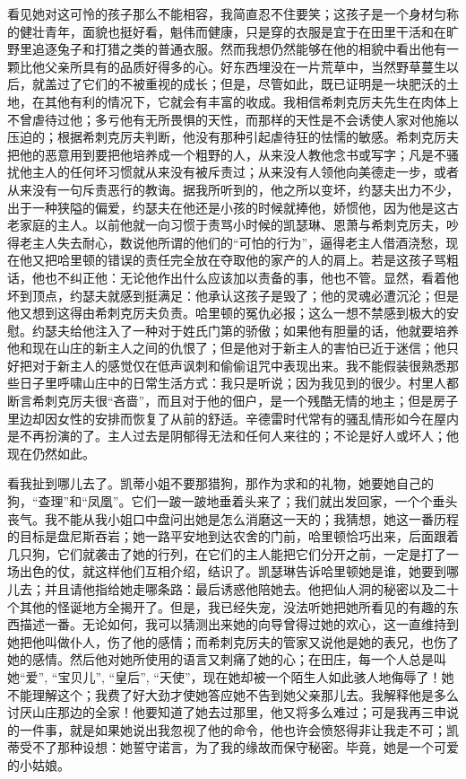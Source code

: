 \par 看见她对这可怜的孩子那么不能相容，我简直忍不住要笑；这孩子是一个身材匀称的健壮青年，面貌也挺好看，魁伟而健康，只是穿的衣服是宜于在田里干活和在旷野里追逐兔子和打猎之类的普通衣服。然而我想仍然能够在他的相貌中看出他有一颗比他父亲所具有的品质好得多的心。好东西埋没在一片荒草中，当然野草蔓生以后，就盖过了它们的不被重视的成长；但是，尽管如此，既已证明是一块肥沃的土地，在其他有利的情况下，它就会有丰富的收成。我相信希刺克厉夫先生在肉体上不曾虐待过他；多亏他有无所畏惧的天性，而那样的天性是不会诱使人家对他施以压迫的；根据希刺克厉夫判断，他没有那种引起虐待狂的怯懦的敏感。希刺克厉夫把他的恶意用到要把他培养成一个粗野的人，从来没人教他念书或写字；凡是不骚扰他主人的任何坏习惯就从来没有被斥责过；从来没有人领他向美德走一步，或者从来没有一句斥责恶行的教诲。据我所听到的，他之所以变坏，约瑟夫出力不少，出于一种狭隘的偏爱，约瑟夫在他还是小孩的时候就捧他，娇惯他，因为他是这古老家庭的主人。以前他就一向习惯于责骂小时候的凯瑟琳、恩萧与希刺克厉夫，吵得老主人失去耐心，数说他所谓的他们的“可怕的行为”，逼得老主人借酒浇愁，现在他又把哈里顿的错误的责任完全放在夺取他的家产的人的肩上。若是这孩子骂粗话，他也不纠正他：无论他作出什么应该加以责备的事，他也不管。显然，看着他坏到顶点，约瑟夫就感到挺满足：他承认这孩子是毁了；他的灵魂必遭沉沦；但是他又想到这得由希刺克厉夫负责。哈里顿的冤仇必报；这么一想不禁感到极大的安慰。约瑟夫给他注入了一种对于姓氏门第的骄傲；如果他有胆量的话，他就要培养他和现在山庄的新主人之间的仇恨了；但是他对于新主人的害怕已近于迷信；他只好把对于新主人的感觉仅在低声讽刺和偷偷诅咒中表现出来。我不能假装很熟悉那些日子里呼啸山庄中的日常生活方式：我只是听说；因为我见到的很少。村里人都断言希刺克厉夫很“吝啬”，而且对于他的佃户，是一个残酷无情的地主；但是房子里边却因女性的安排而恢复了从前的舒适。辛德雷时代常有的骚乱情形如今在屋内是不再扮演的了。主人过去是阴郁得无法和任何人来往的；不论是好人或坏人；他现在仍然如此。
\par 看我扯到哪儿去了。凯蒂小姐不要那猎狗，那作为求和的礼物，她要她自己的狗，“查理”和“凤凰”。它们一跛一跛地垂着头来了；我们就出发回家，一个个垂头丧气。我不能从我小姐口中盘问出她是怎么消磨这一天的；我猜想，她这一番历程的目标是盘尼斯吞岩；她一路平安地到达农舍的门前，哈里顿恰巧出来，后面跟着几只狗，它们就袭击了她的行列，在它们的主人能把它们分开之前，一定是打了一场出色的仗，就这样他们互相介绍，结识了。凯瑟琳告诉哈里顿她是谁，她要到哪儿去；并且请他指给她走哪条路：最后诱惑他陪她去。他把仙人洞的秘密以及二十个其他的怪诞地方全揭开了。但是，我已经失宠，没法听她把她所看见的有趣的东西描述一番。无论如何，我可以猜测出来她的向导曾得过她的欢心，这一直维持到她把他叫做仆人，伤了他的感情；而希刺克厉夫的管家又说他是她的表兄，也伤了她的感情。然后他对她所使用的语言又刺痛了她的心；在田庄，每一个人总是叫她“爱”, “宝贝儿”, “皇后”, “天使”，现在她却被一个陌生人如此骇人地侮辱了！她不能理解这个；我费了好大劲才使她答应她不告到她父亲那儿去。我解释他是多么讨厌山庄那边的全家！他要知道了她去过那里，他又将多么难过；可是我再三申说的一件事，就是如果她说出我忽视了他的命令，他也许会愤怒得非让我走不可；凯蒂受不了那种设想：她誓守诺言，为了我的缘故而保守秘密。毕竟，她是一个可爱的小姑娘。



